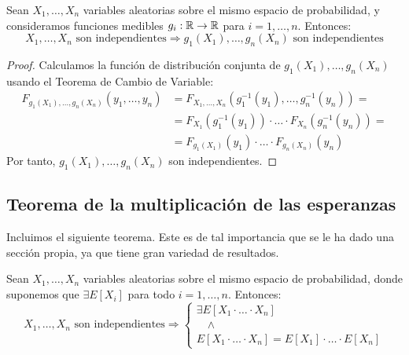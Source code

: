 \begin{prop}
    Sean $X_1, \ldots, X_n$ variables aleatorias sobre el mismo espacio de probabilidad, y consideramos funciones medibles $g_i: \mathbb{R} \to \mathbb{R}$ para $i = 1, \ldots, n$. Entonces:
    \begin{equation*}
        X_1, \ldots, X_n \text{ son independientes} \Longrightarrow g_1(X_1), \ldots, g_n(X_n) \text{ son independientes}
    \end{equation*}
\end{prop}
\begin{proof}
    Calculamos la función de distribución conjunta de $g_1(X_1), \ldots, g_n(X_n)$ usando el Teorema de Cambio de Variable:
    \begin{align*}
        F_{g_1(X_1), \ldots, g_n(X_n)}(y_1, \ldots, y_n)
        &= F_{X_1, \ldots, X_n}(g_1^{-1}(y_1), \ldots, g_n^{-1}(y_n))
        =\\&= F_{X_1}(g_1^{-1}(y_1)) \cdot \ldots \cdot F_{X_n}(g_n^{-1}(y_n))
        =\\&= F_{g_1(X_1)}(y_1) \cdot \ldots \cdot F_{g_n(X_n)}(y_n)
    \end{align*}
    Por tanto, $g_1(X_1), \ldots, g_n(X_n)$ son independientes.
\end{proof}


\subsection{Teorema de la multiplicación de las esperanzas}
Incluimos el siguiente teorema. Este es de tal importancia que se le ha dado una sección propia, ya que tiene gran variedad de resultados.
\begin{teo}
    Sean $X_1, \ldots, X_n$ variables aleatorias sobre el mismo espacio de probabilidad, donde suponemos que $\exists E[X_i]$ para todo $i = 1, \ldots, n$. Entonces:
    \begin{equation*}
        X_1, \ldots, X_n \text{ son independientes} \Longrightarrow \left\{
            \begin{array}{l}
                \exists E[X_1 \cdot \ldots \cdot X_n] \\
                \quad \land \\
                E[X_1 \cdot \ldots \cdot X_n] = E[X_1] \cdot \ldots \cdot E[X_n]
            \end{array}
        \right.
    \end{equation*}
\end{teo}

